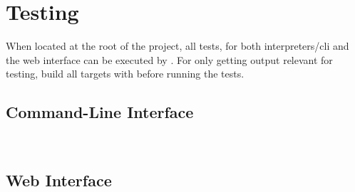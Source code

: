 \section*{Testing}

When located at the root of the project, all tests, for both interpreters/cli and the web interface can be executed by . For only getting output relevant for testing, build all targets with  before running the tests.

\subsection*{Command-Line Interface}
\\

\subsection*{Web Interface}
\\
\\
